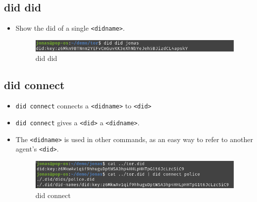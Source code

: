 \hypertarget{did-did}{%
\subsection{\texorpdfstring{did did }{did did }}\label{did-did}}

\begin{itemize}
\item
  Show the did of a single \lstinline!<didname>!.

  \begin{figure}
  \centering
  \includegraphics[width=\textwidth]{User Interface f8759a9462b24d5f95cf6123d68b89ea/Untitled 4.png}
  \caption{did did}
  \end{figure}
\end{itemize}




\pagebreak




\hypertarget{did-connect}{%
\subsection{\texorpdfstring{did connect
}{did connect  }}\label{did-connect}}

\begin{itemize}
\item
  \lstinline!did connect! connects a
  \lstinline!<didname>! to \lstinline!<did>!
\item
  \lstinline!did connect! gives a
  \lstinline!<did>! a \lstinline!<didname>!.
\item
  The \lstinline!<didname>! is used in other commands, as
  an easy way to refer to another agent's
  \lstinline!<did>!.

  \begin{figure}
  \centering
  \includegraphics[width=\textwidth]{User Interface f8759a9462b24d5f95cf6123d68b89ea/Untitled 5.png}
  \caption{did connect}
  \end{figure}
\end{itemize}

